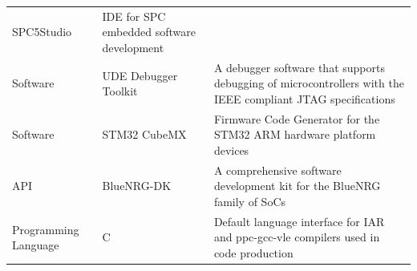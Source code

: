 \documentclass[]{book}
\begin{document}
\begin{longtable}[]{@{}lll@{}}
\begin{minipage}[t]{0.13\columnwidth}
SPC5Studio\strut
\end{minipage} & \begin{minipage}[t]{0.64\columnwidth}\raggedright\strut
IDE for SPC embedded software development\strut
\end{minipage}\tabularnewline
\begin{minipage}[t]{0.13\columnwidth}\raggedright\strut
Software\strut
\end{minipage} & \begin{minipage}[t]{0.13\columnwidth}\raggedright\strut
UDE Debugger Toolkit\strut
\end{minipage} & \begin{minipage}[t]{0.64\columnwidth}\raggedright\strut
A debugger software that supports debugging of microcontrollers with the
IEEE compliant JTAG specifications\strut
\end{minipage}\tabularnewline
\begin{minipage}[t]{0.13\columnwidth}\raggedright\strut
Software\strut
\end{minipage} & \begin{minipage}[t]{0.13\columnwidth}\raggedright\strut
STM32 CubeMX\strut
\end{minipage} & \begin{minipage}[t]{0.64\columnwidth}\raggedright\strut
Firmware Code Generator for the STM32 ARM hardware platform
devices\strut
\end{minipage}\tabularnewline
\begin{minipage}[t]{0.13\columnwidth}\raggedright\strut
API\strut
\end{minipage} & \begin{minipage}[t]{0.13\columnwidth}\raggedright\strut
BlueNRG-DK\strut
\end{minipage} & \begin{minipage}[t]{0.64\columnwidth}\raggedright\strut
A comprehensive software development kit for the BlueNRG family of
SoCs\strut
\end{minipage}\tabularnewline
\begin{minipage}[t]{0.13\columnwidth}\raggedright\strut
Programming Language\strut
\end{minipage} & \begin{minipage}[t]{0.13\columnwidth}\raggedright\strut
C\strut
\end{minipage} & \begin{minipage}[t]{0.64\columnwidth}\raggedright\strut
Default language interface for IAR and ppc-gcc-vle compilers used in
code production\strut

\end{minipage}
\end{longtable}
\end{document}
